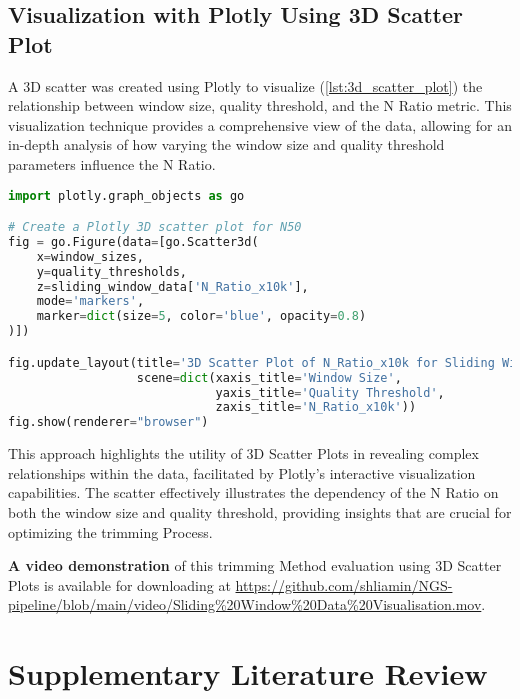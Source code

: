 \subsection{Visualization with Plotly Using 3D Scatter Plot } \label{sec:sliding_window_trimming_visualisation}
A 3D \gls{scatter} was created using Plotly to visualize (\autoref{lst:3d_scatter_plot}) the relationship between window size, quality threshold, and the N Ratio metric. This visualization technique provides a comprehensive view of the data, allowing for an in-depth analysis of how varying the window size and quality threshold parameters influence the N Ratio.

\begin{lstlisting}[language=Python, label={lst:3d_scatter_plot}, caption=Creating 3D Scatter Plot with Plotly]
import plotly.graph_objects as go

# Create a Plotly 3D scatter plot for N50
fig = go.Figure(data=[go.Scatter3d(
    x=window_sizes,
    y=quality_thresholds,
    z=sliding_window_data['N_Ratio_x10k'],
    mode='markers',
    marker=dict(size=5, color='blue', opacity=0.8)
)])

fig.update_layout(title='3D Scatter Plot of N_Ratio_x10k for Sliding Window Trimming',
                  scene=dict(xaxis_title='Window Size',
                             yaxis_title='Quality Threshold',
                             zaxis_title='N_Ratio_x10k'))
fig.show(renderer="browser")
\end{lstlisting}

This approach highlights the utility of 3D Scatter Plots in revealing complex relationships within the data, facilitated by Plotly's interactive visualization capabilities. The \gls{scatter} effectively illustrates the dependency of the N Ratio on both the window size and quality threshold, providing insights that are crucial for optimizing the \gls{trimming} Process.

\textbf{A video demonstration} of this \gls{trimming} Method evaluation using 3D Scatter Plots is available for downloading at \url{https://github.com/shliamin/NGS-pipeline/blob/main/video/Sliding%20Window%20Data%20Visualisation.mov}.







\section{Supplementary Literature Review}

